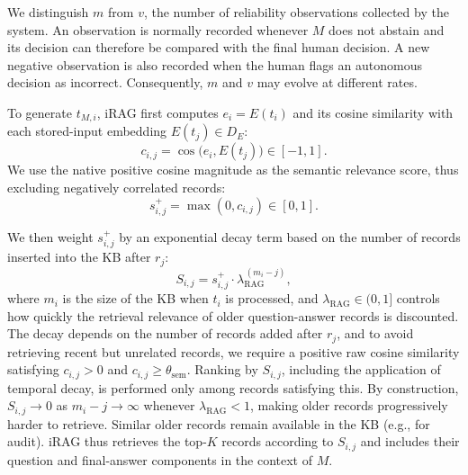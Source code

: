 \documentclass[a4paper,twoside]{article}
\begin{document}
We distinguish $m$ from $v$, the number of reliability observations collected by the system. An observation is normally recorded whenever $M$ does not abstain and its decision can therefore be compared with the final human decision. A new negative observation is also recorded when the human flags an autonomous decision as incorrect. Consequently, $m$ and $v$ may evolve at different rates.

To generate $t_{M,i}$, iRAG first computes $e_i=E(t_i)$ and its cosine similarity with each stored-input embedding $E(t_j)\in D_E$:
\begin{equation}
c_{i,j}=\cos\!\big(e_i,E(t_j)\big)\in[-1,1].
\end{equation}
We use the native positive cosine magnitude as the semantic relevance score, thus excluding negatively correlated records:
\begin{equation}
s^+_{i,j}=\max(0,c_{i,j})\in[0,1].
\end{equation}

We then weight $s^+_{i,j}$ by an exponential decay term based on the number of records inserted into the KB after $r_j$:
\begin{equation}
\label{eq:score}
S_{i,j}
=
s^+_{i,j}\cdot\lambda_{\mathrm{RAG}}^{\,(m_i-j)},
\end{equation}
where $m_i$ is the size of the KB when $t_i$ is processed, and $\lambda_{\mathrm{RAG}}\in(0,1]$ controls how quickly the retrieval relevance of older question-answer records is discounted. The decay depends on the number of records added after $r_j$, and
to avoid retrieving recent but unrelated records, we require a positive raw cosine similarity satisfying $c_{i,j}>0$ and $c_{i,j}\geq\theta_{\mathrm{sem}}$. Ranking by $S_{i,j}$, including the application of temporal decay, is performed only among records satisfying this. %
By construction, $S_{i,j}\to0$ as $m_i-j\to\infty$ whenever $\lambda_{\mathrm{RAG}}<1$, making older records progressively harder to retrieve. %
Similar older records remain available in the KB (e.g., for audit).
iRAG thus retrieves the top-$K$ records according to $S_{i,j}$
and includes their question and final-answer components in the context of $M$.
\end{document}
